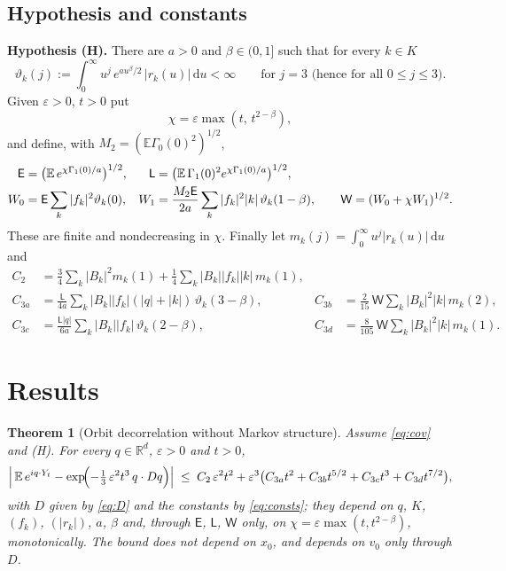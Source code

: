 \documentclass[11pt]{article}
\newcommand{\dd}{\mathrm{d}}
\newcommand{\E}{\mathbb{E}}
\newcommand{\eps}{\varepsilon}
\newcommand{\sE}{\mathsf{E}}
\newcommand{\sL}{\mathsf{L}}
\newcommand{\sW}{\mathsf{W}}
\newtheorem{theorem}{Theorem}
\theoremstyle{remark}
\begin{document}
\subsection{Hypothesis and constants}

\noindent\textbf{Hypothesis (H).} There are $a>0$ and $\beta\in(0,1]$ such
that for every $k\in K$
\begin{equation}
  \vartheta_k(j) := \int_0^\infty u^j\,e^{a u^\beta/2}\,|r_k(u)|\,\dd u<\infty
  \qquad\text{for } j = 3 \text{ (hence for all } 0\le j\le3).
\end{equation}
Given $\eps>0$, $t>0$ put
\begin{equation}
  \chi = \eps\max(t,\,t^{2-\beta}),
\end{equation}
and define, with $M_2 = (\E\Gamma_0(0)^2)^{1/2}$,
\begin{align}
  \sE &= \bigl(\E\,e^{\chi\Gamma_1(0)/a}\bigr)^{1/2}, &
  \sL &= \bigl(\E\,\Gamma_1(0)^2e^{\chi\Gamma_1(0)/a}\bigr)^{1/2}, \notag\\
  W_0 &= \sE\sum_k|f_k|^2\vartheta_k(0), &
  W_1 &= \frac{M_2\sE}{2a}\sum_k|f_k|^2|k|\,\vartheta_k(1-\beta), \qquad
  \sW = (W_0+\chi W_1)^{1/2}.
  \label{eq:EL}
\end{align}
These are finite and nondecreasing in $\chi$. Finally let
$m_k(j) = \int_0^\infty u^j|r_k(u)|\,\dd u$ and
\begin{equation}
\begin{aligned}
  C_2 &= \frac34\sum_k|B_k|^2m_k(1) + \frac14\sum_k|B_k||f_k||k|\,m_k(1), \\
  C_{3a} &= \frac{\sL}{4a}\sum_k|B_k||f_k|(|q|+|k|)\,\vartheta_k(3-\beta), &
  C_{3b} &= \frac{2}{15}\,\sW\sum_k|B_k|^2|k|\,m_k(2), \\
  C_{3c} &= \frac{\sL|q|}{6a}\sum_k|B_k||f_k|\,\vartheta_k(2-\beta), &
  C_{3d} &= \frac{8}{105}\,\sW\sum_k|B_k|^2|k|\,m_k(1).
\end{aligned}
\label{eq:consts}
\end{equation}

\section{Results}

\begin{theorem}[Orbit decorrelation without Markov structure]\label{thm:main}
Assume \eqref{eq:cov} and \textup{(H)}. For every $q\in\mathbb{R}^d$,
$\eps>0$ and $t>0$,
\begin{equation}
  \Bigl|\,\E\,e^{iq\cdot Y_t} - \exp\!\Bigl(-\tfrac13\,\eps^2t^3\,q\cdot Dq\Bigr)\Bigr|
  \;\le\; C_2\,\eps^2t^2
  + \eps^3\bigl(C_{3a}t^2 + C_{3b}t^{5/2} + C_{3c}t^3 + C_{3d}t^{7/2}\bigr),
  \label{eq:main}
\end{equation}
with $D$ given by \eqref{eq:D} and the constants by \eqref{eq:consts}; they
depend on $q$, $K$, $(f_k)$, $(|r_k|)$, $a$, $\beta$ and, through $\sE$,
$\sL$, $\sW$ only, on $\chi = \eps\max(t,t^{2-\beta})$, monotonically. The
bound does not depend on $x_0$, and depends on $v_0$ only through $D$.
\end{theorem}
\end{document}

